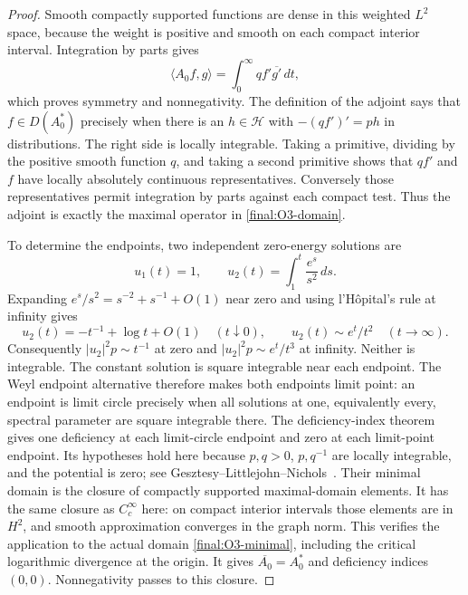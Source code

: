 \begin{proof}
Smooth compactly supported functions are dense in this weighted $L^2$
space, because the weight is positive and smooth on each compact
interior interval.  Integration by parts gives
\[
 \langle A_0f,g\rangle=\int_0^\infty qf'\overline{g'}\,dt,
\]
which proves symmetry and nonnegativity.
The definition of the adjoint says that $f\in D(A_0^*)$ precisely when
there is an $h\in\mathcal H$ with $-(qf')'=ph$ in distributions.
The right side is locally integrable.  Taking a primitive, dividing
by the positive smooth function $q$, and taking a second primitive
shows that $qf'$ and $f$ have locally absolutely continuous
representatives.  Conversely those representatives permit integration
by parts against each compact test.  Thus the adjoint is exactly the
maximal operator in \eqref{final:O3-domain}.

To determine the endpoints, two independent zero-energy solutions are
\[
 u_1(t)=1,\qquad u_2(t)=\int_1^t\frac{e^s}{s^2}\,ds.
\]
Expanding $e^s/s^2=s^{-2}+s^{-1}+O(1)$ near zero and using
l'H\^opital's rule at infinity gives
\[
 u_2(t)=-t^{-1}+\log t+O(1)\quad(t\downarrow0),\qquad
 u_2(t)\sim e^t/t^2\quad(t\to\infty).
\]
Consequently $|u_2|^2p\sim t^{-1}$ at zero and
$|u_2|^2p\sim e^t/t^3$ at infinity.  Neither is integrable.
The constant solution is square integrable near each endpoint.
The Weyl endpoint alternative therefore makes both endpoints limit
point: an endpoint is limit circle precisely when all solutions at
one, equivalently every, spectral parameter are square integrable
there.  The deficiency-index theorem gives one deficiency at each
limit-circle endpoint and zero at each limit-point endpoint.
Its hypotheses hold here because $p,q>0$, $p,q^{-1}$ are locally
integrable, and the potential is zero; see
Gesztesy--Littlejohn--Nichols~\cite[Theorems 3.6 and 3.8]{GLN}.
Their minimal domain is the closure of compactly
supported maximal-domain elements.  It has the same closure as
$C_c^\infty$ here: on compact interior intervals those elements are
in $H^2$, and smooth approximation converges in the graph norm.
This verifies the application to the actual domain
\eqref{final:O3-minimal}, including the critical logarithmic divergence
at the origin.  It gives $\overline{A_0}=A_0^*$ and deficiency indices
$(0,0)$.  Nonnegativity passes to this closure.


\end{proof}
